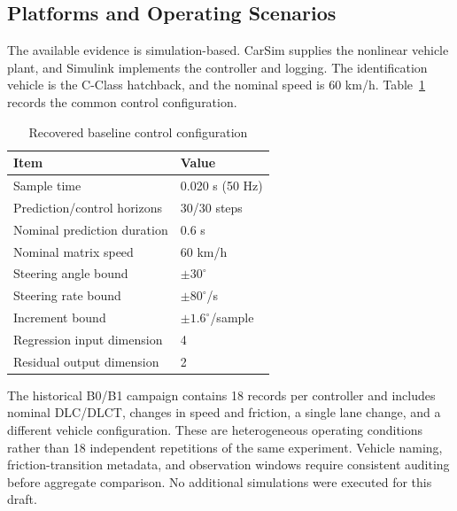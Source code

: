 \documentclass[10pt,journal]{IEEEtran}
\begin{document}
\subsection{Platforms and Operating Scenarios}
The available evidence is simulation-based. CarSim supplies the nonlinear vehicle plant, and Simulink implements the controller and logging. The identification vehicle is the C-Class hatchback, and the nominal speed is 60 km/h. Table~\ref{tab:configuration} records the common control configuration.
\begin{table}[!t]
\caption{Recovered baseline control configuration}
\label{tab:configuration}\centering\footnotesize
\begin{tabular}{@{}ll@{}}\toprule
Item & Value\\\midrule
Sample time & 0.020 s (50 Hz)\\
Prediction/control horizons & 30/30 steps\\
Nominal prediction duration & 0.6 s\\
Nominal matrix speed & 60 km/h\\
Steering angle bound & $\pm30^\circ$\\
Steering rate bound & $\pm80^\circ$/s\\
Increment bound & $\pm1.6^\circ$/sample\\
Regression input dimension & 4\\
Residual output dimension & 2\\\bottomrule
\end{tabular}
\end{table}

The historical B0/B1 campaign contains 18 records per controller and includes nominal DLC/DLCT, changes in speed and friction, a single lane change, and a different vehicle configuration. These are heterogeneous operating conditions rather than 18 independent repetitions of the same experiment. Vehicle naming, friction-transition metadata, and observation windows require consistent auditing before aggregate comparison. No additional simulations were executed for this draft.
\end{document}
